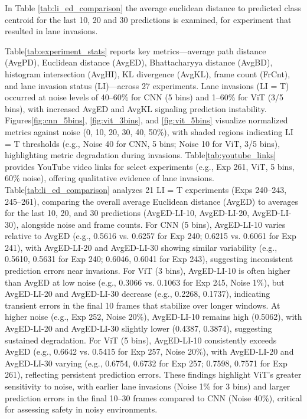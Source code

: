 In Table \ref{tab:li_ed_comparison} the average euclidean distance to predicted class centroid for the last 10, 20 and 30 predictions is examined, for experiment that resulted in lane invasions. 

Table\ref{tab:experiment_stats} reports key metrics—average path distance (AvgPD), Euclidean distance (AvgED), Bhattacharyya distance (AvgBD), histogram intersection (AvgHI), KL divergence (AvgKL), frame count (FrCnt), and lane invasion status (LI)—across 27 experiments. Lane invasions (LI = T) occurred at noise levels of 40–60\% for CNN (5 bins) and 1–60\% for ViT (3/5 bins), with increased AvgED and AvgKL signaling prediction instability. Figures\ref{fig:cnn_5bins}, \ref{fig:vit_3bins}, and \ref{fig:vit_5bins} visualize normalized metrics against noise (0, 10, 20, 30, 40, 50\%), with shaded regions indicating LI = T thresholds (e.g., Noise 40 for CNN, 5 bins; Noise 10 for ViT, 3/5 bins), highlighting metric degradation during invasions. Table\ref{tab:youtube_links} provides YouTube video links for select experiments (e.g., Exp 261, ViT, 5 bins, 60\% noise), offering qualitative evidence of lane invasions. Table\ref{tab:li_ed_comparison} analyzes 21 LI = T experiments (Exps 240–243, 245–261), comparing the overall average Euclidean distance (AvgED) to averages for the last 10, 20, and 30 predictions (AvgED-LI-10, AvgED-LI-20, AvgED-LI-30), alongside noise and frame counts. For CNN (5 bins), AvgED-LI-10 varies relative to AvgED (e.g., 0.5616 vs. 0.6257 for Exp 240; 0.6215 vs. 0.6061 for Exp 241), with AvgED-LI-20 and AvgED-LI-30 showing similar variability (e.g., 0.5610, 0.5631 for Exp 240; 0.6046, 0.6041 for Exp 243), suggesting inconsistent prediction errors near invasions. For ViT (3 bins), AvgED-LI-10 is often higher than AvgED at low noise (e.g., 0.3066 vs. 0.1063 for Exp 245, Noise 1\%), but AvgED-LI-20 and AvgED-LI-30 decrease (e.g., 0.2268, 0.1737), indicating transient errors in the final 10 frames that stabilize over longer windows. At higher noise (e.g., Exp 252, Noise 20\%), AvgED-LI-10 remains high (0.5062), with AvgED-LI-20 and AvgED-LI-30 slightly lower (0.4387, 0.3874), suggesting sustained degradation. For ViT (5 bins), AvgED-LI-10 consistently exceeds AvgED (e.g., 0.6642 vs. 0.5415 for Exp 257, Noise 20\%), with AvgED-LI-20 and AvgED-LI-30 varying (e.g., 0.6754, 0.6732 for Exp 257; 0.7598, 0.7571 for Exp 261), reflecting persistent prediction errors. These findings highlight ViT’s greater sensitivity to noise, with earlier lane invasions (Noise 1\% for 3 bins) and larger prediction errors in the final 10–30 frames compared to CNN (Noise 40\%), critical for assessing safety in noisy environments.


